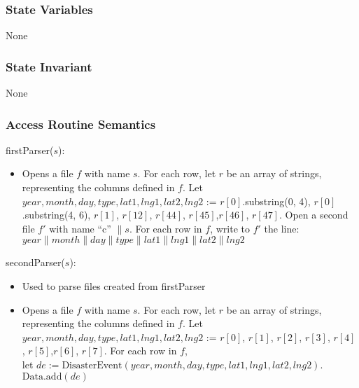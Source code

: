 \documentclass[12pt]{article}
\begin{document}
\subsubsection* {State Variables}

None

\subsubsection* {State Invariant}

None

\newpage
\subsubsection* {Access Routine Semantics}

firstParser($s$):
\begin{itemize}
\item Opens a file $f$ with name $s$. For each row, let $r$ be an array of strings, representing the columns defined in $f$. Let $year, month, day, type, lat1, lng1, lat2, lng2$ := $r[0]$.substring(0, 4), $r[0]$.substring(4, 6), $r[1]$, $r[12]$, $r[44]$, $r[45]$,$r[46]$, $r[47]$. Open a second file $f'$ with name ``c'' $\|s$. For each row in $f$, write to $f'$ the line:\\
$year\|month\|day\|type\|lat1\|lng1\|lat2\|lng2$
\end{itemize}

secondParser($s$):
\begin{itemize}
\item Used to parse files created from firstParser
\item Opens a file $f$ with name $s$. For each row, let $r$ be an array of strings, representing the columns defined in $f$. Let $year, month, day, type, lat1, lng1, lat2, lng2$ := $r[0]$, $r[1]$, $r[2]$, $r[3]$, $r[4]$, $r[5]$,$r[6]$, $r[7]$. For each row in $f$, \\let $de := \mbox{DisasterEvent}(year, month, day, type, lat1, lng1, lat2, lng2)$. 
$\mbox{Data}.\mbox{add}(de)$
\end{itemize}
\end{document}
